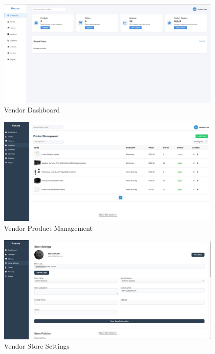\begin{figure}[htbp]
\centering
\includegraphics[width=\textwidth,keepaspectratio]{thesis/figures/Vendor-Dashboard.jpg}
\caption{Vendor Dashboard}
\label{fig:vendor-dashboard}
\end{figure}

\begin{figure}[htbp]
\centering
\includegraphics[width=\textwidth,keepaspectratio]{thesis/figures/Vendor-Products.png}
\caption{Vendor Product Management}
\label{fig:vendor-products}
\end{figure}

\begin{figure}[htbp]
\centering
\includegraphics[width=\textwidth,keepaspectratio]{thesis/figures/vendor-store-settings.png}
\caption{Vendor Store Settings}
\label{fig:vendor-settings}
\end{figure}

